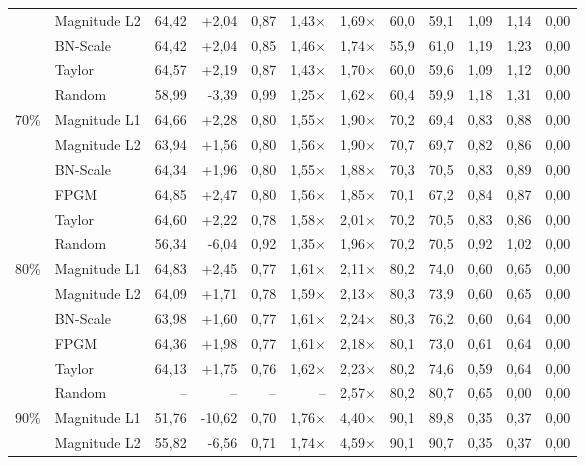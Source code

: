\begin{table}[H]
{{\begin{tabular}{c l rr rrr rr rrr}
     & Magnitude L2 & 64,42 & +2,04 & 0,87 & 1,43$\times$ & 1,69$\times$ & 60,0 & 59,1 & 1,09 & 1,14 & 0,00 \\
     & BN-Scale & 64,42 & +2,04 & 0,85 & 1,46$\times$ & 1,74$\times$ & 55,9 & 61,0 & 1,19 & 1,23 & 0,00 \\
     & Taylor & 64,57 & +2,19 & 0,87 & 1,43$\times$ & 1,70$\times$ & 60,0 & 59,6 & 1,09 & 1,12 & 0,00 \\
     & Random & 58,99 & -3,39 & 0,99 & 1,25$\times$ & 1,62$\times$ & 60,4 & 59,9 & 1,18 & 1,31 & 0,00 \\
    \midrule
    \multirow{6}{*}{70\%} & Magnitude L1 & 64,66 & +2,28 & 0,80 & 1,55$\times$ & 1,90$\times$ & 70,2 & 69,4 & 0,83 & 0,88 & 0,00 \\
     & Magnitude L2 & 63,94 & +1,56 & 0,80 & 1,56$\times$ & 1,90$\times$ & 70,7 & 69,7 & 0,82 & 0,86 & 0,00 \\
     & BN-Scale & 64,34 & +1,96 & 0,80 & 1,55$\times$ & 1,88$\times$ & 70,3 & 70,5 & 0,83 & 0,89 & 0,00 \\
     & FPGM & 64,85 & +2,47 & 0,80 & 1,56$\times$ & 1,85$\times$ & 70,1 & 67,2 & 0,84 & 0,87 & 0,00 \\
     & Taylor & 64,60 & +2,22 & 0,78 & 1,58$\times$ & 2,01$\times$ & 70,2 & 70,5 & 0,83 & 0,86 & 0,00 \\
     & Random & 56,34 & -6,04 & 0,92 & 1,35$\times$ & 1,96$\times$ & 70,2 & 70,5 & 0,92 & 1,02 & 0,00 \\
    \midrule
    \multirow{6}{*}{80\%} & Magnitude L1 & 64,83 & +2,45 & 0,77 & 1,61$\times$ & 2,11$\times$ & 80,2 & 74,0 & 0,60 & 0,65 & 0,00 \\
     & Magnitude L2 & 64,09 & +1,71 & 0,78 & 1,59$\times$ & 2,13$\times$ & 80,3 & 73,9 & 0,60 & 0,65 & 0,00 \\
     & BN-Scale & 63,98 & +1,60 & 0,77 & 1,61$\times$ & 2,24$\times$ & 80,3 & 76,2 & 0,60 & 0,64 & 0,00 \\
     & FPGM & 64,36 & +1,98 & 0,77 & 1,61$\times$ & 2,18$\times$ & 80,1 & 73,0 & 0,61 & 0,64 & 0,00 \\
     & Taylor & 64,13 & +1,75 & 0,76 & 1,62$\times$ & 2,23$\times$ & 80,2 & 74,6 & 0,59 & 0,64 & 0,00 \\
     & Random & -- & -- & -- & -- & 2,57$\times$ & 80,2 & 80,7 & 0,65 & 0,00 & 0,00 \\
    \midrule
    \multirow{6}{*}{90\%} & Magnitude L1 & 51,76 & -10,62 & 0,70 & 1,76$\times$ & 4,40$\times$ & 90,1 & 89,8 & 0,35 & 0,37 & 0,00 \\
     & Magnitude L2 & 55,82 & -6,56 & 0,71 & 1,74$\times$ & 4,59$\times$ & 90,1 & 90,7 & 0,35 & 0,37 & 0,00 \\

\end{tabular}}}
\end{table}
